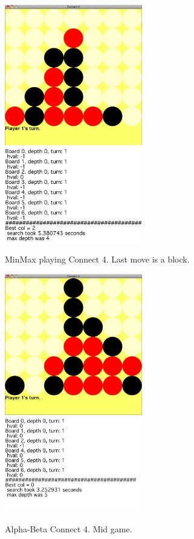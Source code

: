 \documentclass[12pt]{article}
\begin{document}
\begin{figure}[h!]
        \begin{center}
		\includegraphics[width=60mm]{report_images/mm_play.png}
		\includegraphics[width=60mm]{report_images/mm_play_text.png}
                	\caption{MinMax playing Connect 4. Last move is a block.}
                	\label{mm_play}
        \end{center}
\end{figure}



\begin{figure}[h!]
        \begin{center}
		\includegraphics[width=60mm]{report_images/ab_play.png}
		\includegraphics[width=60mm]{report_images/ab_play_text.png}
                	\caption{Alpha-Beta Connect 4. Mid game.}
                	\label{ab_play}
        \end{center}
\end{figure}
\end{document}
